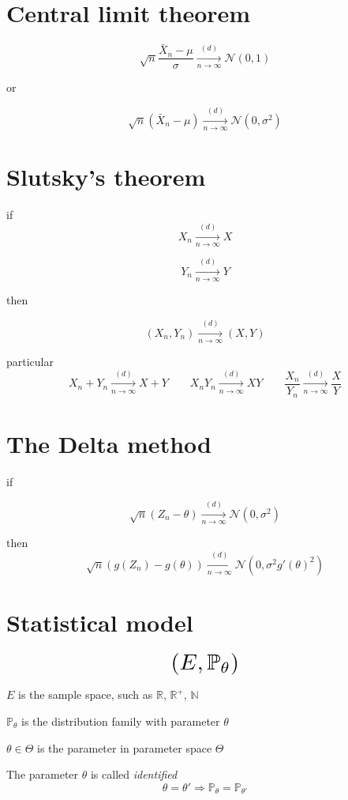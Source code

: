 \documentclass[12pt,a4paper]{article}
\author{Jiejia Xu}
\begin{document}
\section{Central limit theorem}
\[
\sqrt{n}\frac{\bar{X}_n -\mu}{\sigma} \xrightarrow[n \rightarrow \infty]{(d)} \mathcal{N}(0,1)
\]

\noindent or

\[
\sqrt{n}(\bar{X}_n -\mu) \xrightarrow[n \rightarrow \infty]{(d)} \mathcal{N}(0,\sigma^2)
\]

\section{Slutsky’s theorem}
if
\[
X_n \xrightarrow[n \rightarrow \infty]{(d)} X
\]

\[
Y_n \xrightarrow[n \rightarrow \infty]{(d)} Y
\]

\noindent then

\[
(X_n,Y_n) \xrightarrow[n \rightarrow \infty]{(d)} (X,Y)
\]

\noindent particular
\[
X_n+Y_n \xrightarrow[n \rightarrow \infty]{(d)} X+Y
\quad\quad
X_nY_n \xrightarrow[n \rightarrow \infty]{(d)} XY
\quad\quad
\frac{X_n}{Y_n}  \xrightarrow[n \rightarrow \infty]{(d)} \frac{X}{Y}
\]

\section{The Delta method}
if

\[
\sqrt{n}(Z_n -\theta) \xrightarrow[n \rightarrow \infty]{(d)} \mathcal{N}(0,\sigma^2)
\]

\noindent then
\[
\sqrt{n}(g(Z_n) -g(\theta)) \xrightarrow[n \rightarrow \infty]{(d)} \mathcal{N}(0,\sigma^2 g'(\theta)^2)
\]


\section{Statistical model}
\[
\scalebox{2}{\ensuremath{(E,\mathbb{P}_\theta)}}
\]

$E$ is the sample space, such as $\mathbb{R}$, $\mathbb{R}^+$, $\mathbb{N}$

$\mathbb{P}_\theta$ is the distribution family with parameter $\theta$

$\theta \in \Theta$ is the parameter in parameter space $\Theta$

\vspace{1cm}
The parameter $\theta$ is called \textit{identified}
\[
	\theta = \theta' \Rightarrow \mathbb{P}_\theta = \mathbb{P}_{\theta'}
\]
\end{document}
